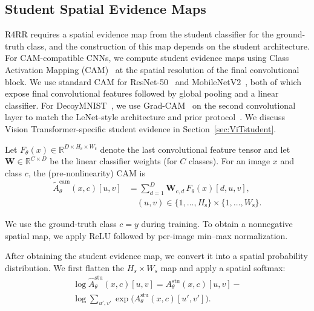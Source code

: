 \subsection{Student Spatial Evidence Maps}
\label{sec:student_maps}
R4RR requires a spatial evidence map from the student classifier for the ground-truth class, and the construction of this map depends on the student architecture. For CAM-compatible CNNs, we compute student evidence maps using Class Activation Mapping (CAM)~\cite{zhou2016learning} at the spatial resolution of the final convolutional block. We use standard CAM for ResNet-50~\cite{he2016deep} and MobileNetV2~\cite{sandler2018mobilenetv2}, both of which expose final convolutional features followed by global pooling and a linear classifier. For DecoyMNIST~\cite{erion2021improving}, we use Grad-CAM~\cite{selvaraju2017grad} on the second convolutional layer to match the LeNet-style architecture and prior protocol~\cite{rieger2020interpretations}. We discuss Vision Transformer-specific student evidence in Section~\ref{sec:ViTstudent}.


Let $F_\theta(x)\in\mathbb{R}^{D\times H_{\mathrm{s}}\times W_{\mathrm{s}}}$ denote the last convolutional feature tensor and let $\mathbf{W}\in\mathbb{R}^{C\times D}$ be the linear classifier weights (for $C$ classes). For an image $x$ and class $c$, the (pre-nonlinearity) CAM is
\begin{equation}
\begin{aligned}
\tilde{A}^{\mathrm{cam}}_\theta(x,c)[u,v]
&=
\sum_{d=1}^{D} \mathbf{W}_{c,d}\,F_\theta(x)[d,u,v],\\
&\quad (u,v)\in\{1,\dots,H_{\mathrm{s}}\}\times\{1,\dots,W_{\mathrm{s}}\}.
\end{aligned}
\end{equation}

We use the ground-truth class $c=y$ during training. To obtain a nonnegative spatial map, we apply ReLU followed by per-image min--max normalization.

After obtaining the student evidence map, we convert it into a spatial probability distribution. We first flatten the $H_s\times W_s$ map and apply a spatial softmax:
\begin{align}
\log \hat{A}^{\mathrm{stu}}_\theta(x,c)[u,v]
=
A^{\mathrm{stu}}_\theta(x,c)[u,v]
- \\ 
\log\!\sum_{u',v'} \exp\!\big(A^{\mathrm{stu}}_\theta(x,c)[u',v']\big).
\end{align}


